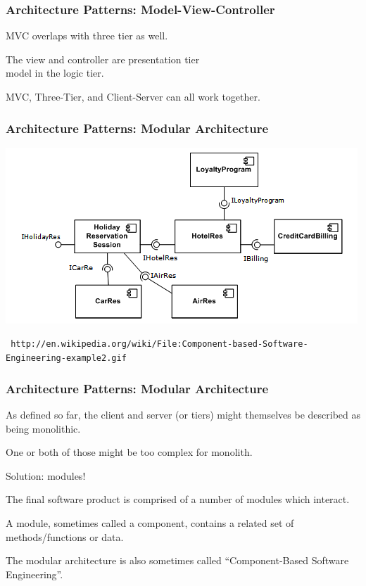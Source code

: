 \begin{frame}
\frametitle{Architecture Patterns: Model-View-Controller}

\begin{changemargin}{1cm}
MVC overlaps with three tier as well.

The view and controller are presentation tier \\
\quad model in the logic tier.

MVC, Three-Tier, and Client-Server can all work together. 

\end{changemargin}
\end{frame}

\begin{frame}
\frametitle{Architecture Patterns: Modular Architecture}
\begin{center}
	\includegraphics[width=\textwidth]{images/cbse.png}
	
	\texttt{\tiny
http://en.wikipedia.org/wiki/File:Component-based-Software-Engineering-example2.gif}
\end{center}
\end{frame}

\begin{frame}
\frametitle{Architecture Patterns: Modular Architecture}

\begin{changemargin}{1cm}
As defined so far, the client and server (or tiers) might themselves be described as being monolithic.

One or both of those might be too complex for monolith.

Solution: modules!

The final software product is comprised of a number of modules which interact.

A module, sometimes called a component, contains a related set of methods/functions or data. 

The modular architecture is also sometimes called ``Component-Based Software Engineering''.

\end{changemargin}
\end{frame}

